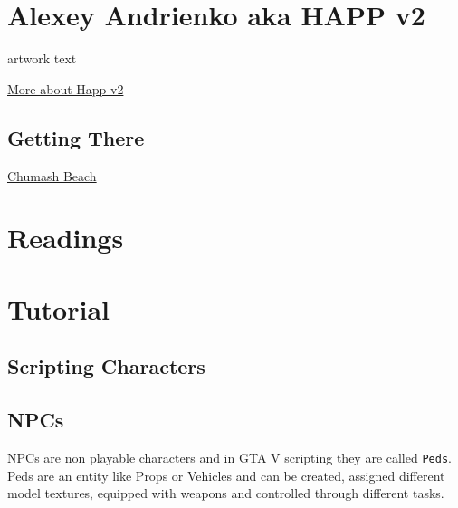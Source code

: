 \documentclass[
  openany]{book}
\begin{document}
\hypertarget{alexey-andrienko-aka-happ-v2}{%
\section*{Alexey Andrienko aka HAPP v2}\label{alexey-andrienko-aka-happ-v2}}

artwork text

\href{https://www.gamescenes.org/2018/02/game-art-happ-v2s-in-game-photography.html}{More about Happ v2}

\hypertarget{getting-there-7}{%
\subsection*{Getting There}\label{getting-there-7}}

\href{https://grandtheftdata.com/landmarks/\#-2629.132,626.461,4,atlas,name=beach,Chumash_Beach,_Chumash}{Chumash Beach}

\hypertarget{readings-4}{%
\section*{Readings}\label{readings-4}}

\hypertarget{tutorial-4}{%
\section*{Tutorial}\label{tutorial-4}}

\hypertarget{scripting-characters}{%
\subsection*{Scripting Characters}\label{scripting-characters}}

\hypertarget{npcs}{%
\subsection*{NPCs}\label{npcs}}

NPCs are non playable characters and in GTA V scripting they are called \texttt{Peds}. Peds are an entity like Props or Vehicles and can be created, assigned different model textures, equipped with weapons and controlled through different tasks.
\end{document}
